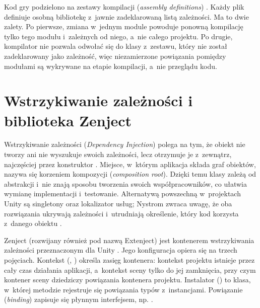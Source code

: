 Kod gry podzielono na zestawy kompilacji (\emph{assembly definitions}) \cite{unity-asmdef}.
Każdy plik  definiuje osobną bibliotekę z~jawnie zadeklarowaną listą
zależności. Ma to dwie zalety. Po pierwsze, zmiana w~jednym module powoduje ponowną
kompilację tylko tego modułu i~zależnych od niego, a~nie całego projektu. Po drugie,
kompilator nie pozwala odwołać się do klasy z~zestawu, który nie został zadeklarowany jako
zależność, więc niezamierzone powiązania pomiędzy modułami są wykrywane na etapie
kompilacji, a~nie przeglądu kodu.

\section{Wstrzykiwanie zależności i biblioteka Zenject}
\label{sec:di}

Wstrzykiwanie zależności (\emph{Dependency Injection}) polega na tym, że obiekt nie tworzy
ani nie wyszukuje swoich zależności, lecz otrzymuje je z~zewnątrz, najczęściej przez
konstruktor \cite{seemann}. Miejsce, w~którym aplikacja składa graf obiektów, nazywa się
korzeniem kompozycji (\emph{composition root}). Dzięki temu klasy zależą od abstrakcji
i~nie znają sposobu tworzenia swoich współpracowników, co ułatwia wymianę implementacji
i~testowanie. Alternatywą powszechną w~projektach Unity są singletony oraz lokalizator
usług; Nystrom zwraca uwagę, że oba rozwiązania ukrywają zależności i~utrudniają
określenie, który kod korzysta z~danego obiektu \cite{nystrom}.

Zenject (rozwijany również pod nazwą Extenject) jest kontenerem wstrzykiwania zależności
przeznaczonym dla Unity \cite{zenject}. Jego konfiguracja opiera się na trzech pojęciach.
Kontekst (, ) określa zasięg kontenera:
kontekst projektu istnieje przez cały czas działania aplikacji, a~kontekst sceny tylko do
jej zamknięcia, przy czym kontener sceny dziedziczy powiązania kontenera projektu.
Instalator () to klasa, w~której metodzie 
rejestruje się powiązania typów z~instancjami. Powiązanie (\emph{binding}) zapisuje się
płynnym interfejsem, np. .

